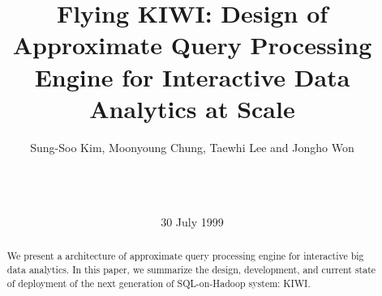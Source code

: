 \documentclass{sig-alternate-05-2015}
\begin{document}






%

\title{Flying KIWI: Design of Approximate Query Processing Engine for Interactive Data Analytics at Scale }


\author{
\alignauthor
Sung-Soo Kim, Moonyoung Chung, Taewhi Lee and Jongho Won \\
       \\
       \\
       \\
}

\date{30 July 1999}

\maketitle
\begin{abstract}
We present a architecture of approximate query processing engine for interactive big data analytics. 
In this paper, we summarize the design, development, and current state of deployment of the next generation of SQL-on-Hadoop system: KIWI.
\end{abstract}
\end{document}
